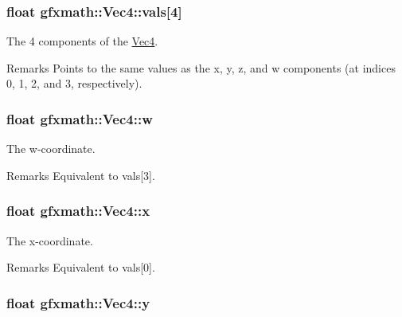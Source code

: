 \subsubsection[{vals}]{\setlength{\rightskip}{0pt plus 5cm}float gfxmath\+::\+Vec4\+::vals\mbox{[}4\mbox{]}}\label{classgfxmath_1_1_vec4_aa668d284af0138ed1d09663fb0bd3d6f}


The 4 components of the \hyperlink{classgfxmath_1_1_vec4}{Vec4}. 

\begin{DoxyRemark}{Remarks}
Points to the same values as the x, y, z, and w components (at indices 0, 1, 2, and 3, respectively). 
\end{DoxyRemark}
\hypertarget{classgfxmath_1_1_vec4_adf2769a47b464dfee8d04e191f21701e}{}
\subsubsection[{w}]{\setlength{\rightskip}{0pt plus 5cm}float gfxmath\+::\+Vec4\+::w}\label{classgfxmath_1_1_vec4_adf2769a47b464dfee8d04e191f21701e}


The w-\/coordinate. 

\begin{DoxyRemark}{Remarks}
Equivalent to vals\mbox{[}3\mbox{]}. 
\end{DoxyRemark}
\hypertarget{classgfxmath_1_1_vec4_a273598aff75406f0e7a47121b8b06037}{}
\subsubsection[{x}]{\setlength{\rightskip}{0pt plus 5cm}float gfxmath\+::\+Vec4\+::x}\label{classgfxmath_1_1_vec4_a273598aff75406f0e7a47121b8b06037}


The x-\/coordinate. 

\begin{DoxyRemark}{Remarks}
Equivalent to vals\mbox{[}0\mbox{]}. 
\end{DoxyRemark}
\hypertarget{classgfxmath_1_1_vec4_a95e0ca27d66d7e0223606c20d326b595}{}
\subsubsection[{y}]{\setlength{\rightskip}{0pt plus 5cm}float gfxmath\+::\+Vec4\+::y}\label{classgfxmath_1_1_vec4_a95e0ca27d66d7e0223606c20d326b595}


